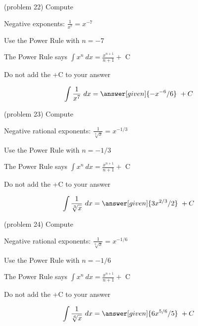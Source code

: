 \documentclass[handout]{ximera}
\begin{document}
\begin{problem}(problem 22)
Compute 

\begin{hint}
Negative exponents: $\frac{1}{x^7} = x^{-7}$
\end{hint}
\begin{hint}
Use the Power Rule with $n=-7$
\end{hint}
\begin{hint}
The Power Rule says $\int x^n \ dx = \frac{x^{n+1}}{n+1} +$ C
\end{hint}
\begin{hint}
\begin{center}
Do not add the +C to your answer
\end{center}
\end{hint}

\[
\int \frac{1}{x^7} \ dx =
\answer[given]{-x^{-6} /6} \ + C
\]
\end{problem}





\begin{problem}(problem 23)
Compute 

\begin{hint}
Negative rational exponents: $\frac{1}{\sqrt[3]x} = x^{-1/3}$
\end{hint}
\begin{hint}
Use the Power Rule with $n=-1/3$
\end{hint}
\begin{hint}
The Power Rule says $\int x^n \ dx = \frac{x^{n+1}}{n+1} +$ C
\end{hint}
\begin{hint}
\begin{center}
Do not add the +C to your answer
\end{center}
\end{hint}

\[
\int \frac{1}{\sqrt[3]x} \ dx =
\answer[given]{3x^{2/3} /2} \ + C
\]
\end{problem}



\begin{problem}(problem 24)
Compute 

\begin{hint}
Negative rational exponents: $\frac{1}{\sqrt[6]x} = x^{-1/6}$
\end{hint}
\begin{hint}
Use the Power Rule with $n=-1/6$
\end{hint}
\begin{hint}
The Power Rule says $\int x^n \ dx = \frac{x^{n+1}}{n+1} +$ C
\end{hint}
\begin{hint}
\begin{center}
Do not add the +C to your answer
\end{center}
\end{hint}

\[
\int \frac{1}{\sqrt[6]x} \ dx =
\answer[given]{6x^{5/6} /5} \ + C
\]
\end{problem}
\end{document}

